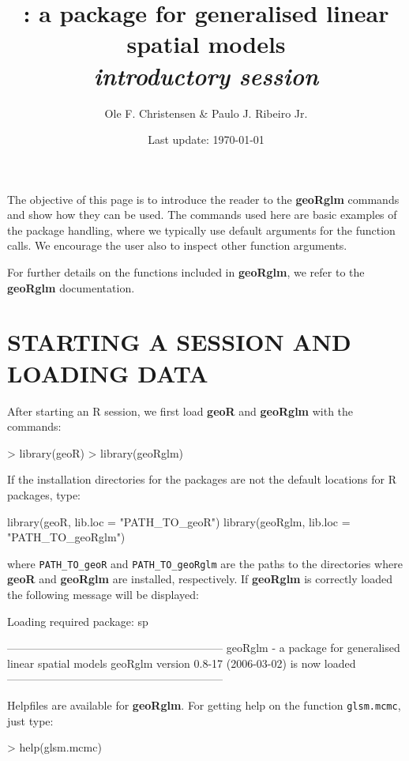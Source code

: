 \documentclass[12pt,a4paper]{article}
\title{\pkg{geoRglm} : a package for  generalised linear spatial models
\\{\it introductory session}}
\author{Ole F. Christensen \& Paulo J. Ribeiro Jr.}
\date{Last update: \today}
\newcommand{\strong}[1]{{\textbf{ #1}}}
\let\pkg=\strong
\newcommand{\code}[1]{\texttt{\small #1}}
\newcommand{\R}{{\textsf{R}}{}}
\begin{document}
\maketitle




The objective of this page is to introduce the reader to the 
\pkg{geoRglm} commands and show how they can be used.
The commands used here are basic examples of the package handling, where we typically use default arguments for the function calls.
We encourage the user also to inspect other function arguments.

For further details on the functions included in \pkg{geoRglm}, we refer to the \pkg{geoRglm} documentation.

\section{STARTING A SESSION AND LOADING DATA}
After starting an \R{} session, we first load \pkg{geoR} and \pkg{geoRglm} with the commands:
\begin{Schunk}
\begin{Sinput}
> library(geoR)
> library(geoRglm)
\end{Sinput}
\end{Schunk}

If the installation directories for the packages are not the default locations for \R{} packages, type:
\begin{Rin}
  library(geoR, lib.loc = "PATH_TO_geoR")
  library(geoRglm, lib.loc = "PATH_TO_geoRglm")
\end{Rin}
where \verb+PATH_TO_geoR+ and \verb+PATH_TO_geoRglm+ are the paths to the directories where \pkg{geoR} and \pkg{geoRglm} are installed, respectively.
If \pkg{geoRglm} is correctly loaded the following message will be displayed:
\begin{Schunk}
\begin{Soutput}
Loading required package: sp
\end{Soutput}
\begin{Soutput}
-----------------------------------------------------------
geoRglm - a package for generalised linear spatial models
geoRglm version 0.8-17 (2006-03-02) is now loaded
-----------------------------------------------------------
\end{Soutput}
\end{Schunk}
Helpfiles are available for \pkg{geoRglm}. For getting help on the function \code{glsm.mcmc}, just type:  
\begin{Rin}
> help(glsm.mcmc)
\end{Rin}
\end{document}
